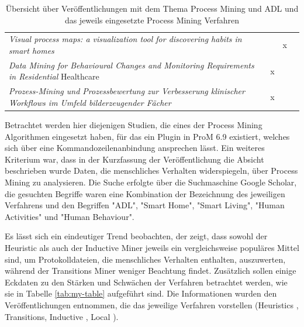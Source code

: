 \begin{table}[!ht]
\begin{tabularx}{\textwidth}{b ccc}
\textit{Visual process maps: a visualization tool for discovering habits in smart homes} \cite{adl9}                            &                                        & x                                      &                                         \\
\textit{Data Mining for Behavioural Changes and Monitoring Requirements in Residential} Healthcare \cite{adl10}                  & x                                      &                                        &                                         \\
\textit{Prozess-Mining und Prozessbewertung zur Verbesserung klinischer Workflows im Umfeld bilderzeugender Fächer} \cite{adl11} & x                                      &                                        &                                         \\ \hline

\end{tabularx}

\caption{Übersicht über Veröffentlichungen mit dem Thema Process Mining und ADL und das jeweils eingesetzte Process Mining Verfahren}
 \label{tab:miningPaper}
\end{table}
\normalsize
Betrachtet werden hier diejenigen Studien, die eines der Process Mining Algorithmen eingesetzt haben, für das ein Plugin in ProM 6.9 existiert, welches sich über eine Kommandozeilenanbindung ansprechen lässt. Ein weiteres Kriterium war, dass in der Kurzfassung der Veröffentlichung die Absicht beschrieben wurde Daten, die menschliches Verhalten widerspiegeln, über Process Mining zu analysieren. Die Suche erfolgte über die Suchmaschine Google Scholar, die gesuchten Begriffe waren eine Kombination der Bezeichnung des jeweiligen Verfahrens und den Begriffen "ADL", "Smart Home", "Smart Living", "Human Activities" und "Human Behaviour". 

Es lässt sich ein eindeutiger Trend beobachten, der zeigt, dass sowohl der Heuristic als auch der Inductive Miner jeweils ein vergleichsweise populäres Mittel sind, um Protokolldateien, die menschliches Verhalten enthalten, auszuwerten, während der Transitions Miner weniger Beachtung findet. Zusätzlich sollen einige Eckdaten zu den Stärken und Schwächen der Verfahren betrachtet werden, wie sie in Tabelle \ref{tab:my-table} aufgeführt sind. Die Informationen wurden den Veröffentlichungen entnommen, die das jeweilige Verfahren vorstellen (Heuristics \cite{heurMining}, Transitions\cite{transMiner}, Inductive \cite{inducIMining}, Local \cite{localMining}). 

